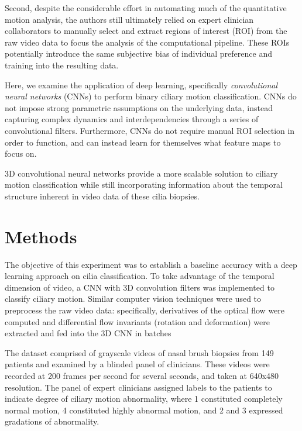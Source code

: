 Second, despite the considerable effort in automating much of the quantitative motion analysis, the authors still ultimately relied on expert clinician collaborators to manually select and extract regions of interest (ROI) from the raw video data to focus the analysis of the computational pipeline. These ROIs potentially introduce the same subjective bias of individual preference and training into the resulting data.

Here, we examine the application of deep learning, specifically \textit{convolutional neural networks} (CNNs) to perform binary ciliary motion classification. CNNs do not impose strong parametric assumptions on the underlying data, instead capturing complex dynamics and interdependencies through a series of convolutional filters. Furthermore, CNNs do not require manual ROI selection in order to function, and can instead learn for themselves what feature maps to focus on.

3D convolutional neural networks provide a more scalable solution to ciliary motion classification while still incorporating information about the temporal structure inherent in video data of these cilia biopsies.

\section{Methods}

The objective of this experiment was to establish a baseline accuracy with a deep learning approach on cilia classification. To take advantage of the temporal dimension of video, a CNN with 3D convolution filters was implemented to classify ciliary motion. Similar computer vision techniques \cite{quinn2011novel} were used to preprocess the raw video data: specifically, derivatives of the optical flow were computed and differential flow invariants (rotation and deformation) were extracted and fed into the 3D CNN in batches

The dataset comprised of grayscale videos of nasal brush biopsies from 149 patients and examined by a blinded panel of clinicians. These videos were recorded at 200 frames per second for several seconds, and taken at 640x480 resolution. The panel of expert clinicians assigned labels to the patients to indicate degree of ciliary motion abnormality, where 1 constituted completely normal motion, 4 constituted highly abnormal motion, and 2 and 3 expressed gradations of abnormality. 


